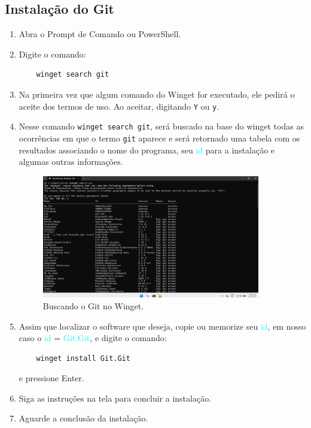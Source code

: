 \subsection{Instalação do Git}
\begin{enumerate}
  \item Abra o Prompt de Comando ou PowerShell.
  \item Digite o comando:
  \begin{verbatim}
    winget search git
  \end{verbatim}
  \item Na primeira vez que algum comando do Winget for executado, ele pedirá o aceite dos termos de uso. Ao aceitar, digitando \texttt{Y} ou \texttt{y}.
  \item Nesse comando \texttt{winget search git}, será buscado na base do winget todas as ocorrências em que o termo \texttt{git} aparece e será retornado uma tabela com os resultados associando o nome do programa, seu \textcolor{cyan}{id} para a instalação e algumas outras informações.
  \begin{figure}[H]
    \centering
    \includegraphics[width=0.9\textwidth]{./assets/images/08_winget_search.png}
    \caption{Buscando o Git no Winget.}
    \label{fig:winget_search}
  \end{figure} 
  \item Assim que localizar o software que deseja, copie ou memorize seu \textcolor{cyan}{id}, em nosso caso o \textcolor{cyan}{id} = \textcolor{cyan}{Git.Git}, e digite o comando:
  \begin{verbatim}
    winget install Git.Git
  \end{verbatim}
  e pressione Enter.
  \item Siga as instruções na tela para concluir a instalação.
  \item Aguarde a conclusão da instalação.
  \begin{figure}[H]

\end{figure}
\end{enumerate}
